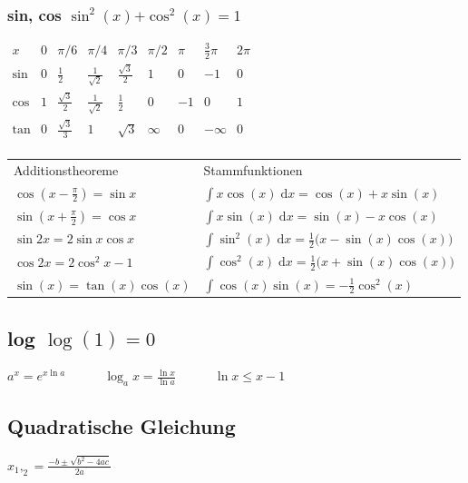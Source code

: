 \documentclass[6pt,a4paper]{scrartcl}
\newcommand{\bs}[1]{\ensuremath{\boldsymbol{#1}}}								%
\newcommand{\diff}{\ensuremath{\;\mathrm d}}									%
\begin{document}
\begin{multicols*}{4}

\subsubsection{sin, cos \quad $\sin^2(x) \bs + \cos^2(x) = 1$}
$\begin{array}{c|c|c|c|c|c|c|c|c}
x & 0 & \pi / 6 & \pi / 4 & \pi / 3 & \pi / 2 & \pi & \frac{3}{2}\pi & 2 \pi \\ \hline
\sin & 0 & \frac{1}{2} & \frac{1}{\sqrt{2}} & \frac{\sqrt 3}{2} & 1 & 0 & -1 & 0 \\
\cos & 1 & \frac{\sqrt 3}{2} & \frac{1}{\sqrt 2} & \frac{1}{2} & 0 & -1 & 0 & 1 \\     
\tan & 0 & \frac{\sqrt{3}}{3}&	1				 &	\sqrt{3} & \infty & 0 & - \infty & 0\\
\end{array}$ 
\begin{tabular}{l  l} 
	Additionstheoreme &  Stammfunktionen\\
 	$\cos (x - \frac{\pi}{2}) = \sin x$ & $\int x \cos(x) \diff x = \cos(x) + x \sin(x)$\\
 	
 	 $\sin (x + \frac{\pi}{2}) = \cos x$ & $\int x \sin(x) \diff x = \sin(x) - x \cos(x)$\\
 	
 	$\sin 2x = 2 \sin x \cos x $  & $\int \sin^2(x) \diff x = \frac12 \bigl(x - \sin(x)\cos(x) \bigr)$\\
     
 	$\cos 2x = 2\cos^2 x - 1$  & $\int \cos^2(x) \diff x = \frac12 \bigl(x + \sin(x)\cos(x) \bigr)$\\

 	$\sin(x) = \tan(x)\cos(x)$ & $\int \cos(x)\sin(x) = -\frac12 \cos^2(x)$ \\
\end{tabular}

\subsection{log \quad $\log(1) = 0$}
$a^x = e^{x \ln a} \qquad \quad \log_a x = \frac{\ln x}{\ln a} \qquad \quad \ln x \le x -1$

\subsection{Quadratische Gleichung}
$x_1,_2 = \frac{-b \pm \sqrt{b^2 - 4ac}}{2a}$


\end{multicols*}
\end{document}
